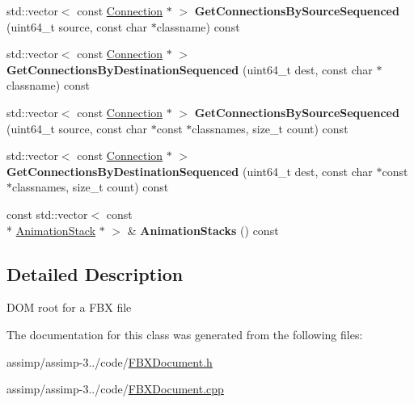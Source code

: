 \begin{DoxyCompactItemize}
\item 
\hypertarget{class_assimp_1_1_f_b_x_1_1_document_ac988694829bfd621e2c95a515c46410f}{std\+::vector$<$ const \hyperlink{class_assimp_1_1_f_b_x_1_1_connection}{Connection} $\ast$ $>$ {\bfseries Get\+Connections\+By\+Source\+Sequenced} (uint64\+\_\+t source, const char $\ast$classname) const }\label{class_assimp_1_1_f_b_x_1_1_document_ac988694829bfd621e2c95a515c46410f}

\item 
\hypertarget{class_assimp_1_1_f_b_x_1_1_document_a51d12644377cd222a545b3e0365d97a9}{std\+::vector$<$ const \hyperlink{class_assimp_1_1_f_b_x_1_1_connection}{Connection} $\ast$ $>$ {\bfseries Get\+Connections\+By\+Destination\+Sequenced} (uint64\+\_\+t dest, const char $\ast$classname) const }\label{class_assimp_1_1_f_b_x_1_1_document_a51d12644377cd222a545b3e0365d97a9}

\item 
\hypertarget{class_assimp_1_1_f_b_x_1_1_document_afefcb3f07ede927a2446f7643c2cd839}{std\+::vector$<$ const \hyperlink{class_assimp_1_1_f_b_x_1_1_connection}{Connection} $\ast$ $>$ {\bfseries Get\+Connections\+By\+Source\+Sequenced} (uint64\+\_\+t source, const char $\ast$const $\ast$classnames, size\+\_\+t count) const }\label{class_assimp_1_1_f_b_x_1_1_document_afefcb3f07ede927a2446f7643c2cd839}

\item 
\hypertarget{class_assimp_1_1_f_b_x_1_1_document_a17fa20cec59ce67b3d2b7a4828895295}{std\+::vector$<$ const \hyperlink{class_assimp_1_1_f_b_x_1_1_connection}{Connection} $\ast$ $>$ {\bfseries Get\+Connections\+By\+Destination\+Sequenced} (uint64\+\_\+t dest, const char $\ast$const $\ast$classnames, size\+\_\+t count) const }\label{class_assimp_1_1_f_b_x_1_1_document_a17fa20cec59ce67b3d2b7a4828895295}

\item 
\hypertarget{class_assimp_1_1_f_b_x_1_1_document_a719c6098fa3117c872ba01c7b6b3ac54}{const std\+::vector$<$ const \\*
\hyperlink{class_assimp_1_1_f_b_x_1_1_animation_stack}{Animation\+Stack} $\ast$ $>$ \& {\bfseries Animation\+Stacks} () const }\label{class_assimp_1_1_f_b_x_1_1_document_a719c6098fa3117c872ba01c7b6b3ac54}

\end{DoxyCompactItemize}


\subsection{Detailed Description}
D\+O\+M root for a F\+B\+X file 

The documentation for this class was generated from the following files\+:\begin{DoxyCompactItemize}
\item 
assimp/assimp-\/3../code/\hyperlink{_f_b_x_document_8h}{F\+B\+X\+Document.\+h}\item 
assimp/assimp-\/3../code/\hyperlink{_f_b_x_document_8cpp}{F\+B\+X\+Document.\+cpp}\end{DoxyCompactItemize}
